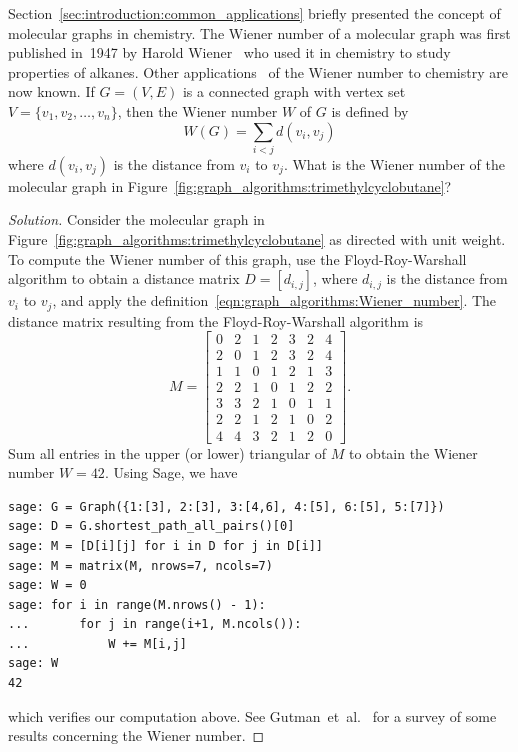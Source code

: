 \begin{example}
Section~\ref{sec:introduction:common_applications} briefly presented
the concept of molecular graphs in chemistry. The
Wiener number of a
molecular graph was first published in~1947 by
Harold Wiener~\cite{Wiener1947} who used it in
chemistry to study properties of alkanes. Other
applications~\cite{GutmanEtAl1993} of the Wiener number to chemistry
are now known. If $G = (V,E)$ is a connected graph with vertex set
$V = \{v_1, v_2, \dots, v_n\}$, then the Wiener number $W$ of $G$ is
defined by
\begin{equation}
\label{eqn:graph_algorithms:Wiener_number}
W(G)
=
\sum_{i < j} d(v_i, v_j)
\end{equation}
where $d(v_i, v_j)$ is the distance from $v_i$ to $v_j$. What is the
Wiener number of the molecular graph in
Figure~\ref{fig:graph_algorithms:trimethylcyclobutane}?
\end{example}

\begin{proof}[Solution]
Consider the molecular graph in
Figure~\ref{fig:graph_algorithms:trimethylcyclobutane} as directed
with unit weight. To compute the Wiener number of this graph, use the
Floyd-Roy-Warshall algorithm to obtain a distance matrix
$D = [d_{i,j}]$, where $d_{i,j}$ is the distance from $v_i$ to $v_j$,
and apply the
definition~\eqref{eqn:graph_algorithms:Wiener_number}. The distance
matrix resulting from the Floyd-Roy-Warshall algorithm is
\[
M
=
\begin{bmatrix}
0 & 2 & 1 & 2 & 3 & 2 & 4 \\
2 & 0 & 1 & 2 & 3 & 2 & 4 \\
1 & 1 & 0 & 1 & 2 & 1 & 3 \\
2 & 2 & 1 & 0 & 1 & 2 & 2 \\
3 & 3 & 2 & 1 & 0 & 1 & 1 \\
2 & 2 & 1 & 2 & 1 & 0 & 2 \\
4 & 4 & 3 & 2 & 1 & 2 & 0
\end{bmatrix}.
\]
Sum all entries in the upper (or lower) triangular of $M$ to obtain
the Wiener number $W = 42$. Using Sage, we have
\begin{lstlisting}
sage: G = Graph({1:[3], 2:[3], 3:[4,6], 4:[5], 6:[5], 5:[7]})
sage: D = G.shortest_path_all_pairs()[0]
sage: M = [D[i][j] for i in D for j in D[i]]
sage: M = matrix(M, nrows=7, ncols=7)
sage: W = 0
sage: for i in range(M.nrows() - 1):
...       for j in range(i+1, M.ncols()):
...           W += M[i,j]
sage: W
42
\end{lstlisting}
which verifies our computation above. See
Gutman~et~al.~\cite{GutmanEtAl1993} for a survey of some results
concerning the Wiener number.
\end{proof}


